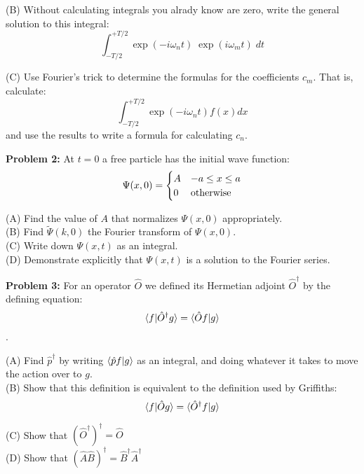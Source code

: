 \documentclass[12pt]{article}
\begin{document}
\noindent
(B) Without calculating integrals you alrady know are zero, write the general solution to this integral:
$$ \int_{-T/2}^{+T/2} \exp(-i \omega_n t) \; \exp(i \omega_m t)  \; dt $$

\noindent
(C) Use Fourier's trick to determine the formulas for the coefficients $c_m$.  That is, calculate:
$$ \int_{-T/2}^{+T/2} \exp(-i \omega_n t) f(x) dx $$
and use the results to write a formula for calculating $c_n$.

\newpage

\noindent
{\bf Problem 2:} At $t=0$ a free particle has the initial wave function:
$$ \Psi(x,0) = 
\begin{cases}    
A & -a \leq x \leq a \\
0 & {\rm otherwise} \\
\end{cases} 
$$

\noindent
(A) Find the value of $A$ that normalizes $\Psi(x,0)$ appropriately.\\

\noindent
(B) Find $\widetilde{\Psi}(k,0)$ the Fourier transform of $\Psi(x,0)$.\\

\noindent
(C) Write down $\Psi(x,t)$ as an integral.\\

\noindent
(D) Demonstrate explicitly that $\Psi(x,t)$ is a solution to the Fourier series.\\

\vskip 2cm

\noindent
{\bf Problem 3:} For an operator $\hat{O}$ we defined its Hermetian adjoint $\hat{O}^\dagger$ by the defining equation:
$$\braket{f|\hat{O}^\dagger g} = \braket{\hat{O} f | g}$$.

\noindent
(A) Find $\hat{p}^\dagger$ by writing $\braket{\hat{p} f | g}$ as an integral, and doing whatever it takes to move the action over to $g$.\\[5pt]

\noindent
(B) Show that this definition is equivalent to the definition used by Griffiths:
$$\braket{f|\hat{O} g} = \braket{\hat{O}^\dagger f | g}$$

\noindent
(C) Show that $\left(\hat{O}^\dagger\right)^\dagger = \hat{O}$\\[5pt]

\noindent
(D) Show that $\left(\hat{A}\hat{B}\right)^\dagger = \hat{B}^\dagger\hat{A}^\dagger$\\[5pt]
\end{document}
